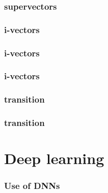 \documentclass[11pt,english]{beamer}
\begin{document}
\begin{frame}
  \frametitle{supervectors}
  
\end{frame}

\begin{frame}
  \frametitle{i-vectors}
  
\end{frame}

\begin{frame}
  \frametitle{i-vectors}
  
\end{frame}

\begin{frame}
  \frametitle{i-vectors}
  
\end{frame}

\begin{frame}
  \frametitle{transition}
  
\end{frame}

\begin{frame}
  \frametitle{transition}
  
\end{frame}

\section{Deep learning}

\begin{frame}
  \frametitle{Use of DNNs}
  
\end{frame}
\end{document}

